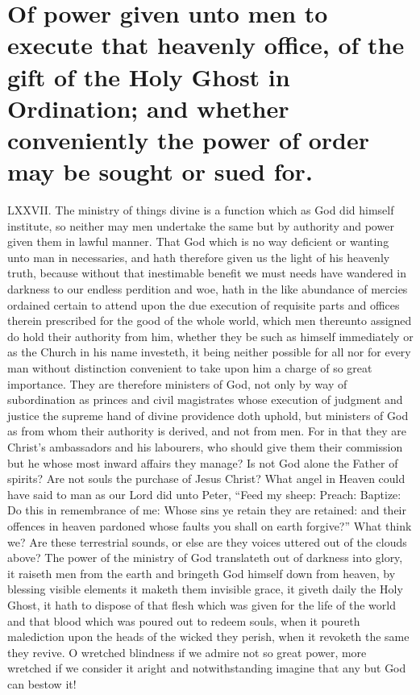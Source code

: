 \section*{Of power given unto men to execute that heavenly office, of the gift of the Holy Ghost in Ordination; and whether conveniently the power of order may be sought or sued for.}
LXXVII. The ministry of things divine is a function which as God did himself institute, so neither may men undertake the same but by authority and power given them in lawful manner. That God which is no way deficient or wanting unto man in necessaries, and hath therefore given us the light of his heavenly truth, because without that inestimable benefit we must needs have wandered in darkness to our endless perdition and woe, hath in the like abundance of mercies ordained certain to attend upon the due execution of requisite parts and offices therein prescribed for the good of the whole world, which men thereunto assigned do hold their authority from him, whether they be such as himself immediately or as the Church in his name investeth, it being neither possible for all nor for every man without distinction convenient to take upon him a charge of so great importance. They are therefore ministers of God, not only by way of subordination as princes and civil magistrates whose execution of judgment and justice the supreme hand of divine providence doth uphold, but ministers of God as from whom their authority is derived, and not from men. For in that they are Christ’s ambassadors and his labourers, who should give them their commission but he whose most inward affairs they manage? Is not God alone the Father of spirits? Are not souls the purchase of Jesus Christ? What angel in Heaven could have said to man as our Lord did unto Peter, “Feed my sheep: Preach: Baptize: Do this in remembrance of me: Whose sins ye retain they are  retained:
 and their offences in heaven pardoned whose faults you shall on earth forgive?” What think we? Are these terrestrial sounds, or else are they voices uttered out of the clouds above? The power of the ministry of God translateth out of darkness into glory, it raiseth men from the earth and bringeth God himself down from heaven, by blessing visible elements it maketh them invisible grace, it giveth daily the Holy Ghost, it hath to dispose of that flesh which was given for the life of the world and that blood which was poured out to redeem souls, when it poureth malediction upon the heads of the wicked they perish, when it revoketh the same they revive. O wretched blindness if we admire not so great power, more wretched if we consider it aright and notwithstanding imagine that any but God can bestow it!

